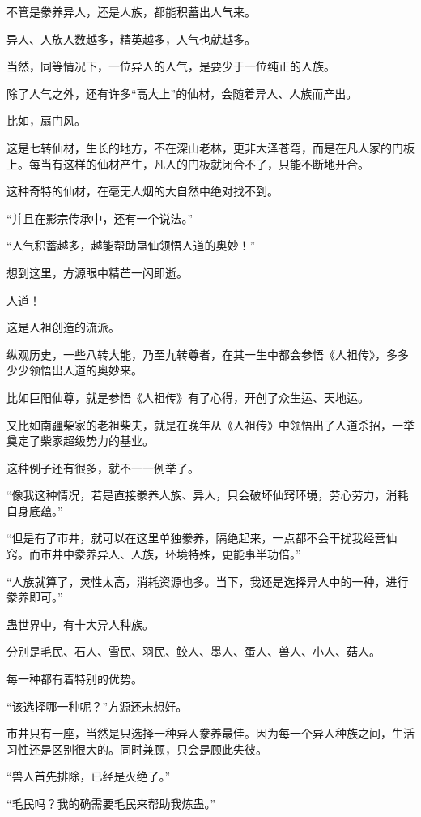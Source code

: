 \begin{this_body}
不管是豢养异人，还是人族，都能积蓄出人气来。

异人、人族人数越多，精英越多，人气也就越多。

当然，同等情况下，一位异人的人气，是要少于一位纯正的人族。

除了人气之外，还有许多“高大上”的仙材，会随着异人、人族而产出。

比如，扇门风。

这是七转仙材，生长的地方，不在深山老林，更非大泽苍穹，而是在凡人家的门板上。每当有这样的仙材产生，凡人的门板就闭合不了，只能不断地开合。

这种奇特的仙材，在毫无人烟的大自然中绝对找不到。

“并且在影宗传承中，还有一个说法。”

“人气积蓄越多，越能帮助蛊仙领悟人道的奥妙！”

想到这里，方源眼中精芒一闪即逝。

人道！

这是人祖创造的流派。

纵观历史，一些八转大能，乃至九转尊者，在其一生中都会参悟《人祖传》，多多少少领悟出人道的奥妙来。

比如巨阳仙尊，就是参悟《人祖传》有了心得，开创了众生运、天地运。

又比如南疆柴家的老祖柴夫，就是在晚年从《人祖传》中领悟出了人道杀招，一举奠定了柴家超级势力的基业。

这种例子还有很多，就不一一例举了。

“像我这种情况，若是直接豢养人族、异人，只会破坏仙窍环境，劳心劳力，消耗自身底蕴。”

“但是有了市井，就可以在这里单独豢养，隔绝起来，一点都不会干扰我经营仙窍。而市井中豢养异人、人族，环境特殊，更能事半功倍。”

“人族就算了，灵性太高，消耗资源也多。当下，我还是选择异人中的一种，进行豢养即可。”

蛊世界中，有十大异人种族。

分别是毛民、石人、雪民、羽民、鲛人、墨人、蛋人、兽人、小人、菇人。

每一种都有着特别的优势。

“该选择哪一种呢？”方源还未想好。

市井只有一座，当然是只选择一种异人豢养最佳。因为每一个异人种族之间，生活习性还是区别很大的。同时兼顾，只会是顾此失彼。

“兽人首先排除，已经是灭绝了。”

“毛民吗？我的确需要毛民来帮助我炼蛊。”


\end{this_body}
